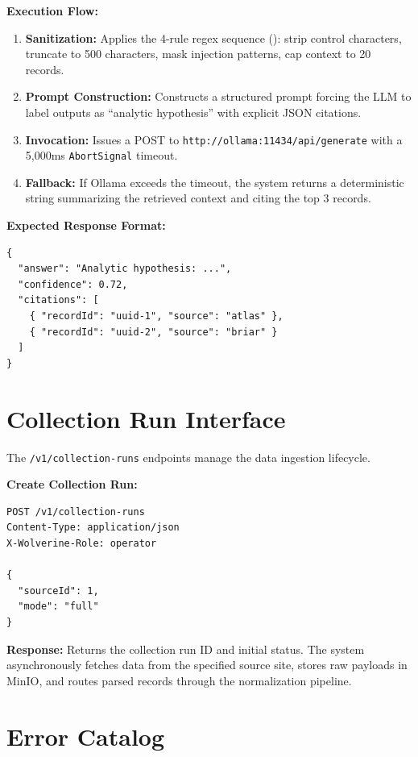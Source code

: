 \textbf{Execution Flow:}
\begin{enumerate}
    \item \textbf{Sanitization:} Applies the 4-rule regex sequence (): strip control characters, truncate to 500 characters, mask injection patterns, cap context to 20 records.
    \item \textbf{Prompt Construction:} Constructs a structured prompt forcing the LLM to label outputs as ``analytic hypothesis'' with explicit JSON citations.
    \item \textbf{Invocation:} Issues a POST to \texttt{http://ollama:11434/api/generate} with a 5,000ms \texttt{AbortSignal} timeout.
    \item \textbf{Fallback:} If Ollama exceeds the timeout, the system returns a deterministic string summarizing the retrieved context and citing the top 3 records.
\end{enumerate}

\textbf{Expected Response Format:}
\begin{verbatim}
{
  "answer": "Analytic hypothesis: ...",
  "confidence": 0.72,
  "citations": [
    { "recordId": "uuid-1", "source": "atlas" },
    { "recordId": "uuid-2", "source": "briar" }
  ]
}
\end{verbatim}

\section{Collection Run Interface}
\label{app-sec:api-collection}

The \texttt{/v1/collection-runs} endpoints manage the data ingestion lifecycle.

\textbf{Create Collection Run:}
\begin{verbatim}
POST /v1/collection-runs
Content-Type: application/json
X-Wolverine-Role: operator

{
  "sourceId": 1,
  "mode": "full"
}
\end{verbatim}

\textbf{Response:} Returns the collection run ID and initial status. The system asynchronously fetches data from the specified source site, stores raw payloads in MinIO, and routes parsed records through the normalization pipeline.

\section{Error Catalog}
\label{app-sec:api-errors}

